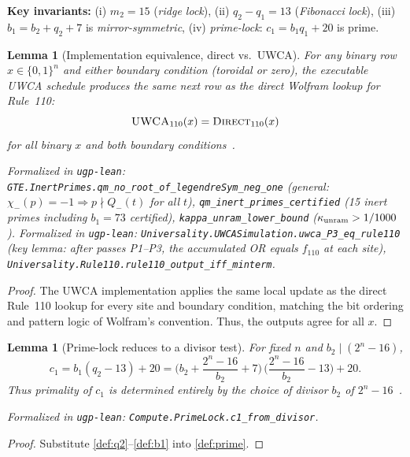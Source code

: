 \documentclass[12pt]{article}
\newtheorem{lemma}[theorem]{Lemma}
\numberwithin{equation}{section}
\begin{document}
\vspace{0.3em}
\noindent\textbf{Key invariants:} (i) $m_2=15$ (\emph{ridge lock}), (ii) $q_2-q_1=13$ (\emph{Fibonacci lock}), (iii) $b_1=b_2+q_2+7$ is \emph{mirror-symmetric}, (iv) \emph{prime-lock}: $c_1=b_1q_1+20$ is prime.

\begin{lemma}[Implementation equivalence, direct vs.\ UWCA]\label{lem:uwca-direct-equiv}
For any binary row $x\in\{0,1\}^n$ and either boundary condition (toroidal or zero), the executable UWCA schedule produces the same next row as the direct Wolfram lookup for Rule~110:
\[
\textsc{UWCA}_{110}(x) = \textsc{Direct}_{110}(x)
\]
for all binary $x$ and both boundary conditions~\cite{SpivackUGPFormalization,ugp-lean}.

\noindent\emph{Formalized in} \texttt{ugp-lean}: \texttt{GTE.InertPrimes.qm\_no\_root\_of\_legendreSym\_neg\_one}
(general: $\chi_-(p)=-1\Rightarrow p\nmid Q_-(t)$ for all $t$),
\texttt{qm\_inert\_primes\_certified} (15 inert primes including $b_1=73$ certified),
\texttt{kappa\_unram\_lower\_bound} ($\kappa_{\rm unram}>1/1000$).
\noindent\emph{Formalized in} \texttt{ugp-lean}: \texttt{Universality.UWCASimulation.uwca\_P3\_eq\_rule110} (key lemma: after passes P1--P3, the accumulated OR equals $f_{110}$ at each site), \texttt{Universality.Rule110.rule110\_output\_iff\_minterm}.
\end{lemma}

\begin{proof}
The UWCA implementation applies the same local update as the direct Rule~110 lookup for every site and boundary condition, matching the bit ordering and pattern logic of Wolfram's convention. Thus, the outputs agree for all $x$.
\end{proof}

\begin{lemma}[Prime-lock reduces to a divisor test]\label{lem:primelock}
For fixed $n$ and $b_2\mid (2^n-16)$,
\[
c_1=b_1(q_2-13)+20=\Big(b_2+\frac{2^n-16}{b_2}+7\Big)\,\Big(\frac{2^n-16}{b_2}-13\Big)+20.
\]
Thus primality of $c_1$ is determined entirely by the choice of divisor $b_2$ of $2^n-16$~\cite{SpivackUGPFormalization,ugp-lean}.

\noindent\emph{Formalized in} \texttt{ugp-lean}: \texttt{Compute.PrimeLock.c1\_from\_divisor}.
\end{lemma}
\begin{proof}
Substitute \ref{def:q2}--\ref{def:b1} into \ref{def:prime}.
\end{proof}
\end{document}
